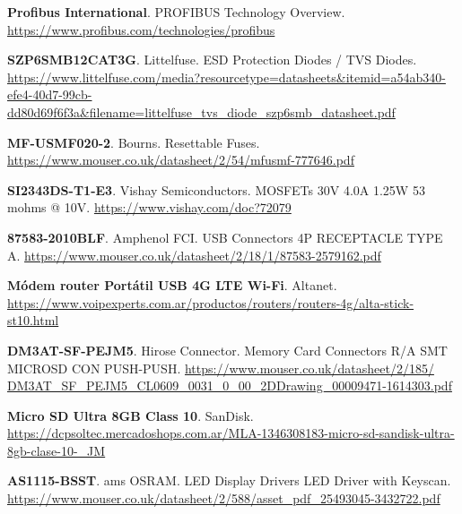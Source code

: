 \begin{thebibliography}{30}
\textbf{Profibus International}. PROFIBUS Technology Overview.
\href{https://www.profibus.com/technologies/profibus}{https://www.profibus.com/technologies/profibus}

\textbf{SZP6SMB12CAT3G}. Littelfuse. ESD Protection Diodes / TVS Diodes.
\href{https://www.littelfuse.com/media?resourcetype=datasheets&itemid=a54ab340-efe4-40d7-99cb-dd80d69f6f3a&filename=littelfuse_tvs_diode_szp6smb_datasheet.pdf}{https://www.littelfuse.com/media?resourcetype=datasheets\&itemid=a54ab340-efe4-40d7-99cb-dd80d69f6f3a\&filename=littelfuse\_tvs\_diode\_szp6smb\_datasheet.pdf}


\textbf{MF-USMF020-2}. Bourns. Resettable Fuses.
\href{https://www.mouser.co.uk/datasheet/2/54/mfusmf-777646.pdf}{https://www.mouser.co.uk/datasheet/2/54/mfusmf-777646.pdf}


\textbf{SI2343DS-T1-E3}. Vishay Semiconductors. MOSFETs 30V 4.0A 1.25W 53 mohms @ 10V. 
\href{https://www.vishay.com/doc?72079}{https://www.vishay.com/doc?72079}

\textbf{87583-2010BLF}. Amphenol FCI. USB Connectors 4P RECEPTACLE TYPE A.
\href{https://www.mouser.co.uk/datasheet/2/18/1/87583-2579162.pdf}{https://www.mouser.co.uk/datasheet/2/18/1/87583-2579162.pdf}

\textbf{Módem router Portátil USB 4G LTE Wi-Fi}. Altanet.
\href{https://www.voipexperts.com.ar/productos/routers/routers-4g/alta-stick-st10.html}{https://www.voipexperts.com.ar/productos/routers/routers-4g/alta-stick-st10.html}


\textbf{DM3AT-SF-PEJM5}. Hirose Connector. Memory Card Connectors R/A SMT MICROSD CON PUSH-PUSH.
\href{https://www.mouser.co.uk/datasheet/2/185/DM3AT_SF_PEJM5_CL0609_0031_0_00_2DDrawing_00009471-1614303.pdf}{https://www.mouser.co.uk/datasheet/2/185/ DM3AT\_SF\_PEJM5\_CL0609\_0031\_0\_00\_2DDrawing\_00009471-1614303.pdf}


\textbf{Micro SD Ultra 8GB Class 10}. SanDisk.
\href{https://dcpsoltec.mercadoshops.com.ar/MLA-1346308183-micro-sd-sandisk-ultra-8gb-clase-10-_JM}{https://dcpsoltec.mercadoshops.com.ar/MLA-1346308183-micro-sd-sandisk-ultra-8gb-clase-10-\_JM}

\textbf{AS1115-BSST}. ams OSRAM. LED Display Drivers LED Driver with Keyscan.
\href{https://www.mouser.co.uk/datasheet/2/588/asset_pdf_25493045-3432722.pdf}{https://www.mouser.co.uk/datasheet/2/588/asset\_pdf\_25493045-3432722.pdf}


\end{thebibliography}
